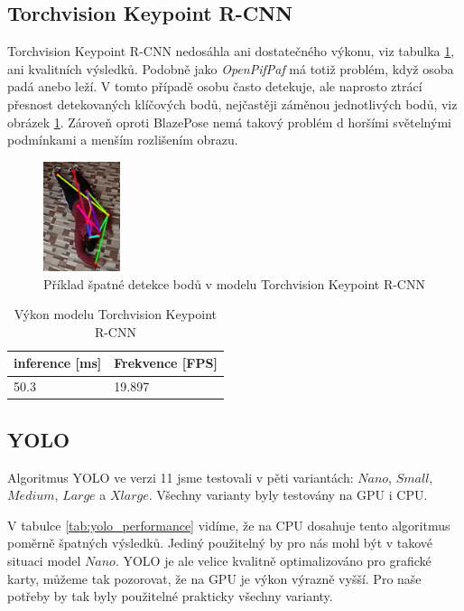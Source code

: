 \subsection{Torchvision Keypoint R-CNN}

Torchvision Keypoint R-CNN nedosáhla ani dostatečného výkonu, viz tabulka
\ref{tab:torchvision_performance}, ani kvalitních výsledků. Podobně jako
\textit{OpenPifPaf} má totiž problém, když osoba padá anebo leží. V tomto
případě osobu často detekuje, ale naprosto ztrácí přesnost detekovaných
klíčových bodů, nejčastěji záměnou jednotlivých bodů, viz obrázek
\ref{fig:torchvision_bad}. Zároveň oproti BlazePose nemá takový problém d
horšími světelnými podmínkami a menším rozlišením obrazu.

\begin{figure}[]
    \centering
    \includegraphics[width=0.2\textwidth]{Figures/pose_tests/torchvision_bad.png}
    \caption{Příklad špatné detekce bodů v modelu Torchvision Keypoint R-CNN}
    \label{fig:torchvision_bad}
\end{figure}

\begin{table}[htbp]
    \centering
    \caption{Výkon modelu Torchvision Keypoint R-CNN}
    \label{tab:torchvision_performance}
    \begin{tabular}{|l|l|}
        \hline
        \textbf{inference [ms]} & \textbf{Frekvence [FPS]} \\
        \hline
        50.3                    & 19.897                   \\ \hline
    \end{tabular}
\end{table}

\subsection{YOLO}

Algoritmus YOLO ve verzi 11 jsme testovali v pěti variantách: $Nano$, $Small$,
$Medium$, $Large$ a $Xlarge$. Všechny varianty byly testovány na GPU i CPU.

V tabulce \ref{tab:yolo_performance} vidíme, že na CPU dosahuje tento
algoritmus poměrně špatných výsledků. Jediný použitelný by pro nás mohl být v
takové situaci model $Nano$. YOLO je ale velice kvalitně optimalizováno pro
grafické karty, můžeme tak pozorovat, že na GPU je výkon výrazně vyšší. Pro
naše potřeby by tak byly použitelné prakticky všechny varianty.

